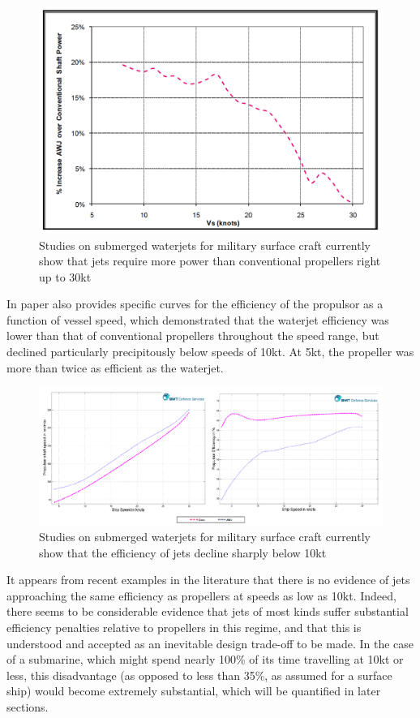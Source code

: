 \documentclass{article}\usepackage[]{graphicx}\usepackage[]{color}
\begin{document}
\begin{figure}
\includegraphics[width=\textwidth]{BMTPowering.png}
\caption{Studies on submerged waterjets for military surface craft currently show that jets require more power than conventional propellers right up to 30kt \parencite{giles2010}}
\label{fig:BMTPowering.png}
\end{figure}

In paper also provides specific curves for the efficiency of the propulsor as a function of vessel speed, which demonstrated that the waterjet efficiency was lower than that of conventional propellers throughout the speed range, but declined particularly precipitously below speeds of 10kt.  At 5kt, the propeller was more than twice as efficient as the waterjet.

\begin{figure}
\includegraphics[width=\textwidth]{BMTEfficiency.png}
\caption{Studies on submerged waterjets for military surface craft currently show that the efficiency of jets decline sharply below 10kt \parencite{giles2010}}
\label{fig:BMTEfficiency.png}
\end{figure}

It appears from recent examples in the literature that there is no evidence of jets approaching the same efficiency as propellers at speeds as low as 10kt.  Indeed, there seems to be considerable evidence that jets of most kinds suffer substantial efficiency penalties relative to propellers in this regime, and that this is understood and accepted as an inevitable design trade-off to be made.  In the case of a submarine, which might spend nearly 100\% of its time travelling at 10kt or less, this disadvantage (as opposed to less than 35\%, as assumed for a surface ship) would become extremely substantial, which will be quantified in later sections.
\end{document}
